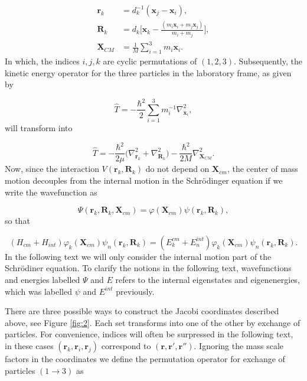 \documentclass{article}
\numberwithin{equation}{section}
\numberwithin{figure}{section}
\begin{document}
\begin{align}
\mathbf{r}_k &= d^{-1}_k(\mathbf{x}_{j}-\mathbf{x}_{i}),  \label{eq:4,1} \\
\mathbf{R}_k &= d_k\Big[\mathbf{x}_{k}-\frac{(m_{i}\mathbf{x}_{i}+m_{j}\mathbf{x}_{j})}{m_{i}+m_{j}}\Big],  \label{eq:4,2}\\
\mathbf{X}_{CM} &= \frac{1}{M} \sum_{i=1}^{3} m_{i} \mathbf{x}_{i}.  \label{eq:4,3}
\end{align}   
In which, the indices $i,j,k$ are cyclic permutations of $(1,2,3)$. Subsequently, the kinetic energy operator for the three particles in the laboratory frame, as given by 

\begin{equation}\label{eq:5}
\hat{T} = -\frac{\hbar^2}{2} \sum_{i=1}^{3} m_{i}^{-1} \nabla^{2}_{\mathbf{x}_{i}}, 
\end{equation}
will transform into

\begin{equation}\label{eq:6}
\hat{T} = -\frac{\hbar^2}{2\mu} \Big(\nabla^{2}_{\mathbf{r}_{k}}+\nabla^{2}_{\mathbf{R}_{k}}\Big) - \frac{\hbar^2}{2 M}\nabla^{2}_{\mathbf{X}_{CM}}. 
\end{equation}
Now, since the interaction $V(\mathbf{r}_k,\mathbf{R}_k)$ do not depend on $\mathbf{X}_{cm}$, the center of mass motion decouples from the internal motion in the Schr{\"o}dinger equation if we write the wavefunction as

\begin{equation}
\Psi(\mathbf{r}_k,\mathbf{R}_k,\mathbf{X}_{cm}) = \varphi(\mathbf{X}_{cm})\psi(\mathbf{r}_k,\mathbf{R}_k),
\end{equation}
so that

\begin{equation}
(H_{cm} + H_{int})\varphi_{k}(\mathbf{X}_{cm})\psi_{n}(\mathbf{r}_k,\mathbf{R}_k) = (E_k^{cm} + E_n^{int})\varphi_{k}(\mathbf{X}_{cm})\psi_{n}(\mathbf{r}_k,\mathbf{R}_k).
\end{equation}
In the following text we will only consider the internal motion part of the  Schr{\"o}diner equation. To clarify the notions in the following text, wavefunctions and energies labelled $\Psi$ and $E$ refers to the internal eigenstates and eigenenergies, which was labelled $\psi$ and $E^{int}$ previously. 

There are three possible ways to construct the Jacobi coordinates described above, see Figure \ref{fig:2}. Each set transforms into one of the other by exchange of particles. For convenience, indices will often be surpressed in the following text, in these cases $(\mathbf{r}_{k}, \mathbf{r}_{i}, \mathbf{r}_{j})$ correspond to $(\mathbf{r}, \mathbf{r}', \mathbf{r}'')$. Ignoring the mass scale factors in the coordinates we define the permutation operator for exchange of particles $(1 \rightarrow 3)$ as 
\end{document}
